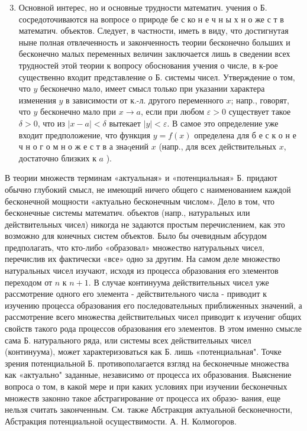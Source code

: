 \documentclass[10pt]{article}
\begin{document}
\begin{enumerate}

  \setcounter{enumi}{2}

  \item Основной интерес, но и основные трудности математич. учения о Б. сосредоточиваются на вопросе о природе бе с ко н е ч н ы х н о же с т в математич. объектов. Следует, в частности, иметь в виду, что достигнутая ныне полная отвлеченность и законченность теории бесконечно больших и бесконечно малых переменных величин заключается лишь в сведении всех трудностей этой теории к вопросу обоснования учения о числе, в к-рое существенно входит представление о Б. системы чисел. Утверждение о том, что $y$ бесконечно мало, имеет смысл только при указании характера изменения $y$ в зависимости от к.-л. другого переменного $x$; напр., говорят, что $y$ бесконечно мало при $x \rightarrow a$, если при любом $\varepsilon>0$ существует такое $\delta>0$, что из $|x-a|<\delta$ вытекает $|y|<\varepsilon$. В самое это определение уже входит предположение, что функция $y=f(x)$ определена для б е с к о н е ч н о г о м н о ж е с т в а знаqений $x$ (напр., для всех действительных $x$, достаточно близких к $a$ ).

\end{enumerate}



В теории множеств терминам «актуальная» и «потенциальная» Б. придают обычно глубокий смысл, не имеющий ничего общего с наименованием каждой бесконечной мощности «актуально бесконечным числом». Дело в том, что бесконечные системы математич. объектов (напр., натуральных или действительных чисел) никогда не задаются простым перечислением, как это возможно для конечных систем объектов. Было бы очевидным абсурдом предполагать, что кто-либо «образовал» множество натуральных чисел, перечислив их фактически «все» одно за другим. На самом деле множество натуральных чисел изучают, исходя из процесса образования его элементов переходом от $n$ к $n+1$. В случае континуума действительных чисел уже рассмотрение одного его элемента - действительного числа - приводит к изучению процесса образования его последовательных приближенных значений, а рассмотрение всего множества действительных чисел приводит к изучениг общих свойств такого рода процессов образования его элементов. В этом именно смысле сама Б. натурального ряда, или системы всех действительных чисел (континуума), может характеризоваться как Б. лишь «потенциальная". Точке зрения потенциальной Б. противополагается взгляд на бесконечные множества как «актуально" заданные, независимо от процесса их образования. Выяснение вопроса о том, в какой мере и при каких условиях при изучении бесконечных множеств законно такое абстрагирование от процесса их образо- вания, еще нельзя считать законченным. См. также Абстракция актуальной бесконечности, Абстракция потенциальной осуществимости. А. Н. Колмогоров.
\end{document}
